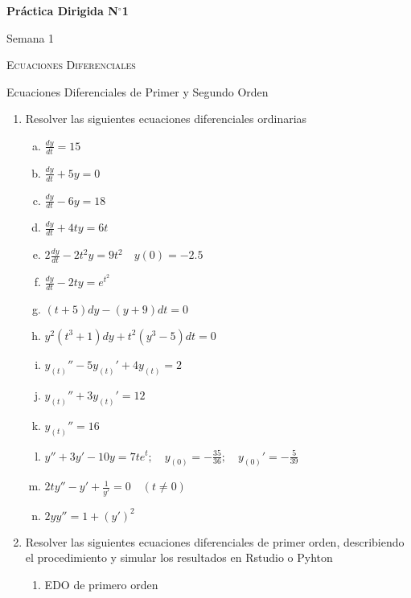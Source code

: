 \documentclass[10pt,a4paper]{article}
\begin{document}
	\begin{center}
		{\Large {\textbf{Práctica Dirigida N$^{\circ}$1}}}
		
		\small{Semana 1}
		
		\textsc{Ecuaciones Diferenciales}
		
		Ecuaciones Diferenciales de Primer y Segundo Orden
		
	\end{center}
	
	\begin{enumerate}
		\item Resolver las siguientes ecuaciones diferenciales ordinarias
		\begin{multicols}{2}
				\begin{enumerate}[a)]
					\item $\frac{dy}{dt}=15$
					\item $\frac{dy}{dt}+5y=0$
					\item $\frac{dy}{dt}-6y=18$
					\item $\frac{dy}{dt}+4ty=6t$
					\item $2\frac{dy}{dt}-2t^2y=9t^2 \quad y(0)=-2.5$
					\item $\frac{dy}{dt}-2ty=e^{t^2}$
					\item $(t+5)dy-(y+9)dt=0$
					\item $y^2(t^3+1)dy+t^2(y^3-5)dt=0$
					\item $y_{(t)}''-5y_{(t)}'+4y_{(t)}=2$
					\item $y_{(t)}''+3y_{(t)}'=12$
					\item $y_{(t)}''=16$
					\item $y''+3y'-10y=7te^{t};\quad y_{(0)}=-\frac{35}{36};\quad y_{(0)}'=- \frac{5}{39}$
					\item $2ty''-y'+\frac{1}{y'}=0\quad (t\neq 0)$
					\item $2yy''=1+(y')^2$
				\end{enumerate}
			\end{multicols}
		\item Resolver las siguientes ecuaciones diferenciales de primer orden, describiendo el procedimiento y simular los resultados en Rstudio o Pyhton
				\begin{enumerate}[2.1]
					\item EDO de primero orden
						\begin{enumerate}[a)]

\end{enumerate}
\end{enumerate}
\end{enumerate}
\end{document}
